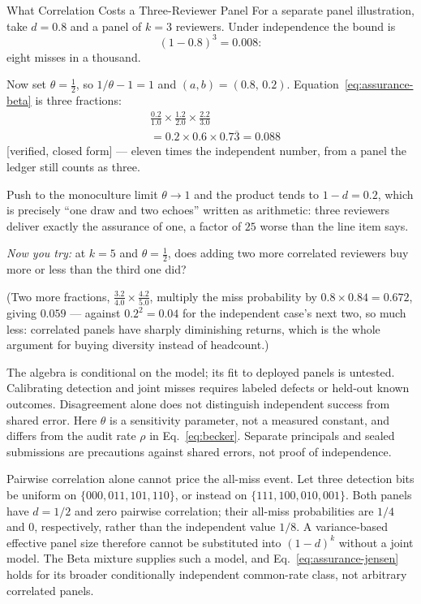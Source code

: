 \documentclass[11pt,a4paper]{article}
\theoremstyle{definition}
\theoremstyle{definition}
\theoremstyle{remark}
\begin{document}
\begin{pdexample}{What Correlation Costs a Three-Reviewer Panel}
\setlength{\parskip}{4pt plus 1pt}
For a separate panel illustration, take $d = 0.8$ and a panel of $k=3$ reviewers. Under
independence the bound is \[
(1-0.8)^3 = 0.008:
\] eight misses in a thousand.

Now set $\theta = \tfrac12$, so $1/\theta - 1 = 1$ and $(a,b) = (0.8,\,0.2)$.
Equation~\ref{eq:assurance-beta} is three fractions:
\[
\begin{aligned}
&\tfrac{0.2}{1.0}\times\tfrac{1.2}{2.0}\times\tfrac{2.2}{3.0}\\
&= 0.2 \times 0.6 \times 0.7\overline{3} = 0.088
\end{aligned}
\] [verified, closed form] --- eleven
times the independent number, from a panel the ledger still counts as three.

Push to the monoculture limit $\theta \to 1$ and the product tends to $1-d = 0.2$,
which is precisely ``one draw and two echoes'' written as arithmetic: three
reviewers deliver exactly the assurance of one, a factor of $25$ worse than the
line item says.

\emph{Now you try:} at $k=5$ and $\theta=\tfrac12$, does adding two
more correlated reviewers buy more or less than the third one did?

(Two more fractions, $\tfrac{3.2}{4.0}\times\tfrac{4.2}{5.0}$, multiply the miss
probability by $0.8 \times 0.84 = 0.672$, giving $0.059$ --- against $0.2^2 = 0.04$
for the independent case's next two, so much less: correlated panels have sharply
diminishing returns, which is the whole argument for buying diversity instead of
headcount.)
\end{pdexample}

The algebra is conditional on the model; its fit to deployed panels is untested.
Calibrating detection and joint misses requires labeled defects or held-out
known outcomes. Disagreement alone does not distinguish independent success
from shared error. Here $\theta$ is a sensitivity parameter, not a measured
constant, and differs from the audit rate $\rho$ in Eq.~\ref{eq:becker}.
Separate principals and sealed submissions are precautions against shared
errors, not proof of independence.

\pdpairwisecounterexample
Pairwise correlation alone cannot price the all-miss event. Let three detection
bits be uniform on $\{000,011,101,110\}$, or instead on
$\{111,100,010,001\}$. Both panels have $d=1/2$ and zero pairwise correlation;
their all-miss probabilities are $1/4$ and $0$, respectively, rather than the
independent value $1/8$. A variance-based effective panel size therefore
cannot be substituted into $(1-d)^k$ without a joint model. The Beta mixture
supplies such a model, and Eq.~\ref{eq:assurance-jensen} holds for its broader
conditionally independent common-rate class, not arbitrary correlated panels.
\end{document}
